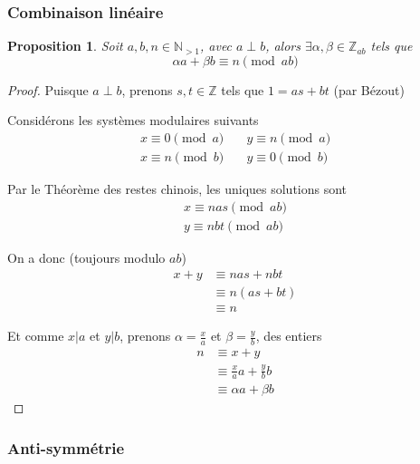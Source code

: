 \documentclass{article}
\newtheorem{proposition}{Proposition}
\begin{document}
\newpage

\subsubsection{Combinaison linéaire}

\begin{proposition}
    Soit $a, b, n \in \mathbb{N}_{>1}$, avec $a \perp b$, alors $\exists \alpha, \beta \in \mathbb{Z}_{ab}$ tels que
    \[ \alpha a + \beta b \equiv n \pmod {ab} \]
\end{proposition}

\begin{proof}
    Puisque $a \perp b$, prenons $s, t \in \mathbb{Z}$ tels que $1 = as + bt$ (par Bézout)

    Considérons les systèmes modulaires suivants
    \begin{align*}
        x \equiv 0 \pmod a &\quad y \equiv n \pmod a \\
        x \equiv n \pmod b &\quad y \equiv 0 \pmod b
    \end{align*}

    Par le Théorème des restes chinois, les uniques solutions sont
    \begin{align*}
        x \equiv nas \pmod {ab} \\
        y \equiv nbt \pmod {ab}
    \end{align*}

    On a donc (toujours modulo $ab$)
    \begin{align*}
        x + y & \equiv nas + nbt \\
              & \equiv n(as + bt) \\
              & \equiv n
    \end{align*}

    Et comme $x \vert a$ et $y \vert b$, prenons $\alpha = \frac{x}{a}$ et $\beta = \frac{y}{b}$, des entiers
    \begin{align*}
        n & \equiv x + y \\
          & \equiv \frac{x}{a}a + \frac{y}{b}b \\
          & \equiv \alpha a + \beta b
    \end{align*}
\end{proof}

\subsubsection{Anti-symmétrie}
\end{document}
